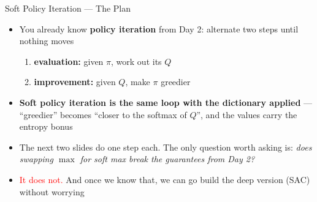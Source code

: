 \begin{frame}{Soft Policy Iteration --- The Plan}
\begin{itemize}
    \item You already know \textbf{policy iteration} from Day 2: alternate two steps until nothing moves
    \begin{enumerate}
        \item \textbf{evaluation:} given $\pi$, work out its $Q$
        \item \textbf{improvement:} given $Q$, make $\pi$ greedier
    \end{enumerate}
    \vspace{0.6em}
    \item \textbf{Soft policy iteration is the same loop with the dictionary applied} --- ``greedier'' becomes ``closer to the softmax of $Q$'', and the values carry the entropy bonus
    \vspace{0.6em}
    \item The next two slides do one step each. The only question worth asking is: \emph{does swapping $\max$ for soft max break the guarantees from Day 2?}
    \item[$\Rightarrow$] \textcolor{red}{It does not.} And once we know that, we can go build the deep version (SAC) without worrying
\end{itemize}
\end{frame}


